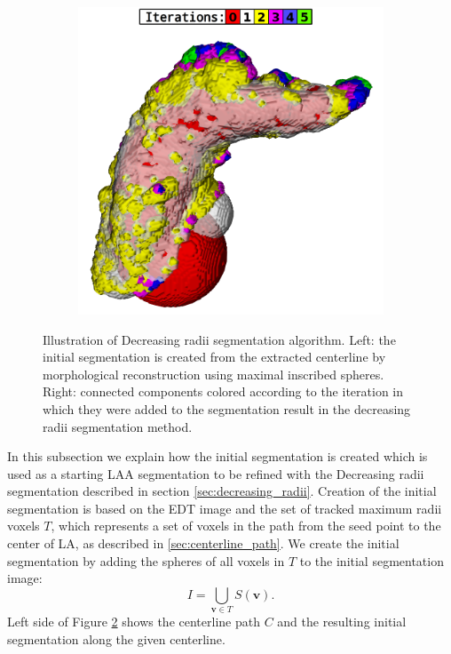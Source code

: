 \documentclass[review]{elsarticle}
\begin{document}
\begin{figure}[t]
\begin{subfigure}[b]{.40\linewidth}
    \includegraphics[width=\textwidth]{fig5b.png}
    \label{fig:decreasing_iterative} 
  \end{subfigure}
  \caption{Illustration of Decreasing radii segmentation algorithm. 
    Left: the initial segmentation is created from the extracted 
    centerline by morphological reconstruction using maximal inscribed spheres. 
    Right: connected components colored according to the iteration in which they were 
    added to the segmentation result in the decreasing radii segmentation method.}
  \label{fig:initial_decreasing_sidebyside}
\end{figure}


In this subsection we explain how the initial segmentation is created which is
used as a starting LAA segmentation to be refined with the Decreasing radii
segmentation described in section \ref{sec:decreasing_radii}.  Creation of the
initial segmentation is based on the EDT image and the set of tracked
maximum radii voxels $T$, which represents a set of voxels in the path from the
seed point to the center of LA, as described in \ref{sec:centerline_path}. We
create the initial segmentation by adding the spheres of all voxels in $T$ to
the initial segmentation image:
\begin{equation}
  \label{eq:initial_seg_spheres_set}
  I = \bigcup_{\mathbf{v}\in T}S(\mathbf{v}).
\end{equation}
Left side of Figure \ref{fig:initial_decreasing_sidebyside} shows the
centerline path $C$ and the resulting initial segmentation along the given
centerline.
\end{document}
